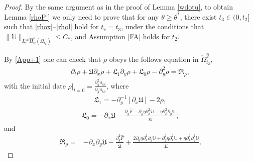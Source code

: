 \documentclass{amsart}
\numberwithin{equation}{section}
\begin{document}
\begin{proof}
By the same argument as in the proof of Lemma \ref{wdotu}, to obtain Lemma \ref{rhoP'} we only need to prove that for any $\theta\geq \theta^{*}$, there exist $t_{3}\in(0,t_{2}]$ such that \eqref{rhox}--\eqref{rhol} hold for $t_{v}=t_{3}$, under the conditions that $\|\mathbb{U}\|_{L_{t}^{\infty}\hat{H}_{\psi}^{s}(\Omega_{t_{2}})}\leq C_{*}$, and Assumption \ref{FA} holds for $t_{2}$.

By \eqref{App+1} one can check that $\rho$ obeys the follows equation in $\check{\Omega}_{t_{2}}^{\hat{y}}$,
\begin{align}\label{rhoe}
\partial_{t}\rho
+\mathfrak{U}\partial_{x}\rho
+\mathfrak{L}_{1}\partial_{y}\rho
+\mathfrak{L}_{0}\rho
-\partial_{y}^{2}\rho
=\mathfrak{R}_{\rho},
\end{align}
with the initial date $\rho|_{t=0}=\frac{\partial_{y}^{2}u_{in}}{\partial_{y}u_{in}}$, where
\begin{align*}
\mathfrak{L}_{1}=-\partial_{y}^{-1}[\partial_{x}\mathfrak{U}]-2\rho,
\end{align*}
\begin{align*}
\mathfrak{L}_{0}
=-\partial_{x}\mathfrak{U}
 -\frac{\partial_{y}\hat{F}-\partial_{y}\eta\partial_{x}^{2}\mathbb{U}-\eta\partial_{x}^{2}\partial_{y}\mathbb{U}}{\dot{\mathfrak{U}}},
\end{align*}
and
\begin{align*}
\mathfrak{R}_{\rho}
=&-\partial_{x}\partial_{y}\mathfrak{U}
  -\frac{\partial_{y}^{2}\hat{F}}{\dot{\mathfrak{U}}}
  +\frac{2\partial_{y}\eta\partial_{x}^{2}\partial_{y}\mathbb{U}+\partial_{y}^{2}\eta\partial_{x}^{2}\mathbb{U}+\eta\partial_{x}^{2}\partial_{y}^{2}\mathbb{U}}{\dot{\mathfrak{U}}}.
\end{align*}


\end{proof}
\end{document}
